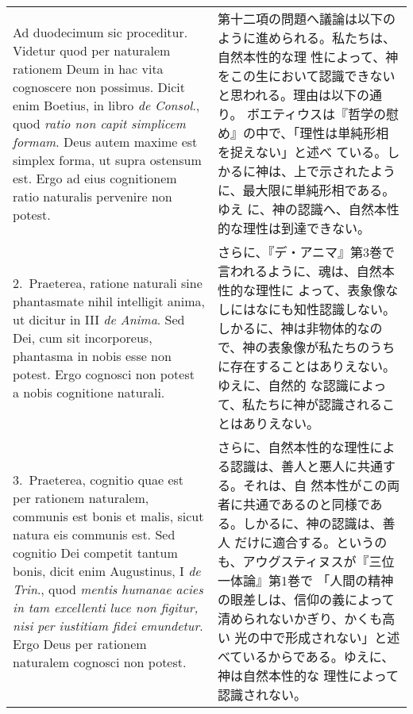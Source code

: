 \documentclass[10pt]{jsarticle} %
\begin{document}
\begin{longtable}{p{21em}p{21em}}

{\sc  Ad duodecimum sic proceditur}. Videtur quod per naturalem rationem
Deum in hac vita cognoscere non possimus. Dicit enim Boetius, in libro
{\it de Consol}., quod {\it ratio non capit simplicem formam}. Deus
autem maxime est simplex forma, ut supra ostensum est. Ergo ad eius
cognitionem ratio naturalis pervenire non potest.

&

第十二項の問題へ議論は以下のように進められる。私たちは、自然本性的な理
性によって、神をこの生において認識できないと思われる。理由は以下の通り。
ボエティウスは『哲学の慰め』の中で、「理性は単純形相を捉えない」と述べ
ている。しかるに神は、上で示されたように、最大限に単純形相である。ゆえ
に、神の認識へ、自然本性的な理性は到達できない。

\\

2.~{\sc  Praeterea}, ratione naturali sine phantasmate nihil
intelligit anima, ut dicitur in III {\it de Anima}. Sed Dei, cum sit
incorporeus, phantasma in nobis esse non potest. Ergo cognosci non
potest a nobis cognitione naturali.

&

さらに、『デ・アニマ』第3巻で言われるように、魂は、自然本性的な理性に
よって、表象像なしにはなにも知性認識しない。しかるに、神は非物体的なの
で、神の表象像が私たちのうちに存在することはありえない。ゆえに、自然的
な認識によって、私たちに神が認識されることはありえない。

\\

3.~{\sc Praeterea}, cognitio quae est per rationem naturalem, communis
est bonis et malis, sicut natura eis communis est. Sed cognitio Dei
competit tantum bonis, dicit enim Augustinus, I {\it de Trin}., quod
{\it mentis humanae acies in tam excellenti luce non figitur, nisi per
iustitiam fidei emundetur}. Ergo Deus per rationem naturalem cognosci
non potest.

&

さらに、自然本性的な理性による認識は、善人と悪人に共通する。それは、自
然本性がこの両者に共通であるのと同様である。しかるに、神の認識は、善人
だけに適合する。というのも、アウグスティヌスが『三位一体論』第1巻で
「人間の精神の眼差しは、信仰の義によって清められないかぎり、かくも高い
光の中で形成されない」と述べているからである。ゆえに、神は自然本性的な
理性によって認識されない。

\\


\end{longtable}
\end{document}
